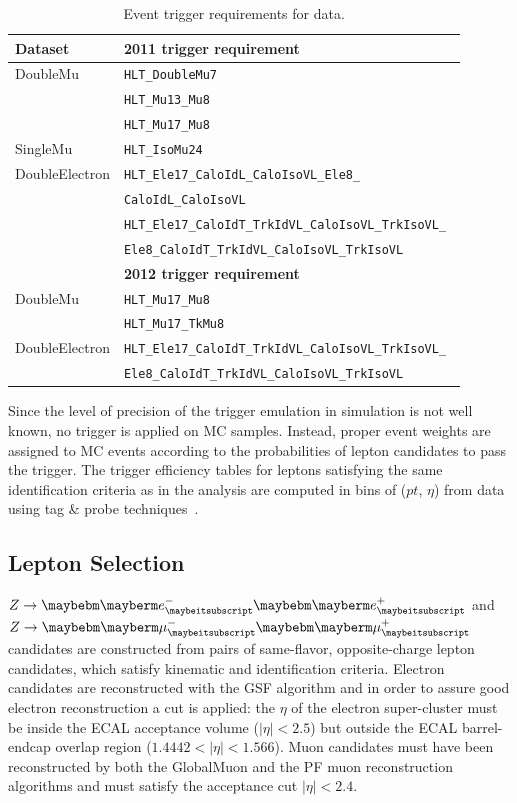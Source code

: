 \begin{table}[htb!]
\caption{ 
Event trigger requirements for data.
}
\label{triggers}
\vspace*{\medskipamount}
\begin{center}
\small
\begin{tabular}{|l l|}
\hline
\bf{Dataset} & \bf{2011 trigger requirement}   \\
\hline
DoubleMu & \tt{HLT\_DoubleMu7} \\
 & \tt{HLT\_Mu13\_Mu8} \\
 & \tt{HLT\_Mu17\_Mu8} \\ \hline
SingleMu & \tt{HLT\_IsoMu24} \\ \hline
DoubleElectron & \tt{HLT\_Ele17\_CaloIdL\_CaloIsoVL\_Ele8\_} \\ 
& \tt{CaloIdL\_CaloIsoVL} \\
 & \tt{HLT\_Ele17\_CaloIdT\_TrkIdVL\_CaloIsoVL\_TrkIsoVL\_} \\
 & \tt{Ele8\_CaloIdT\_TrkIdVL\_CaloIsoVL\_TrkIsoVL} \\ \hline
\bf{} & \bf{2012 trigger requirement}   \\
\hline
DoubleMu & \tt{HLT\_Mu17\_Mu8}\\
 & \tt{HLT\_Mu17\_TkMu8} \\ \hline
DoubleElectron & \tt{HLT\_Ele17\_CaloIdT\_TrkIdVL\_CaloIsoVL\_TrkIsoVL\_} \\ 
& \tt{Ele8\_CaloIdT\_TrkIdVL\_CaloIsoVL\_TrkIsoVL} \\
\hline
\end{tabular}
\end{center}
\end{table}
Since the level of precision of the trigger emulation in simulation is not well known, no trigger is applied on MC samples. Instead, proper event weights are assigned to MC events according to the probabilities of lepton candidates to pass the trigger. The trigger efficiency tables for leptons satisfying the same identification criteria as in the analysis are computed in bins of ($pt$, $\eta$) from data using tag \& probe techniques~\cite{CMS-AN-2011-399}. 

\subsection{Lepton Selection}
$Z \rightarrow \Pem \Pep$ and $Z \rightarrow \Pgmm \Pgmp$ candidates are constructed from pairs of same-flavor, opposite-charge lepton candidates, which satisfy kinematic and identification criteria. Electron candidates are reconstructed with the GSF algorithm and in order to assure good electron reconstruction a cut is applied: the $\eta$ of the electron super-cluster must be inside the ECAL acceptance volume ($|\eta|<2.5$) but outside the ECAL barrel-endcap overlap region ($1.4442<|\eta|<1.566$). Muon candidates must have been reconstructed by both the GlobalMuon and the PF muon reconstruction algorithms and must satisfy the acceptance cut $|\eta|<2.4$.

